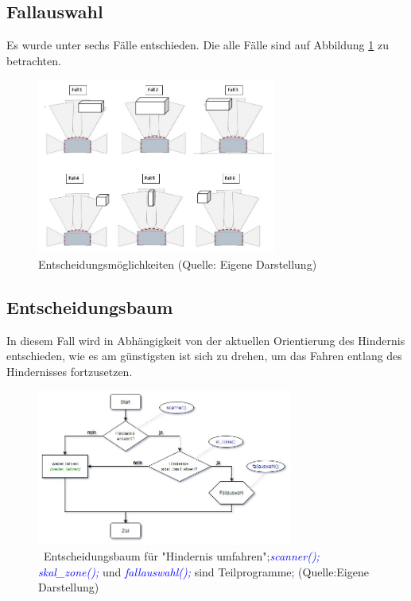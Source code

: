 \subsection{Fallauswahl}

Es wurde unter sechs Fälle entschieden. Die alle Fälle sind auf Abbildung \ref{faelle} zu betrachten.

\begin{figure}[!h]  %
	\centering\includegraphics[width=0.7\textwidth]{images/faelle.jpg}
	\caption{ Entscheidungsmöglichkeiten \newline (Quelle: Eigene Darstellung)}
	\label{faelle} %
\end{figure}

\subsection{Entscheidungsbaum}

In diesem Fall wird in Abhängigkeit von der aktuellen Orientierung des Hindernis entschieden, wie es am günstigsten ist sich zu drehen, um das Fahren entlang des Hindernisses fortzusetzen. 

\begin{figure}[!h] 
	\centering\includegraphics[width=0.75\textwidth]{images/Entsch-baum1.jpg}
	\caption{ \ Entscheidungsbaum für "Hindernis umfahren";\textcolor{blue}{\textit{scanner(); skal\_zone();}} und \textcolor{blue}{\textit {fallauswahl();}} sind Teilprogramme;   (Quelle:Eigene Darstellung)}
	\label{baum1} 
\end{figure}

